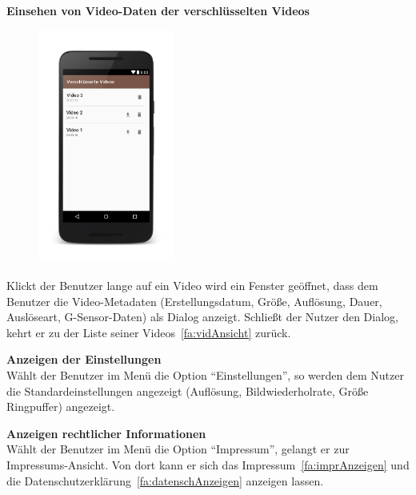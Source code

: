 \begin{enumerate}
\item \label{fa:metaVerschlVid}
\textbf{Einsehen von Video-Daten der verschlüsselten Videos} \hfill \\
\begin{minipage}[t]{\linewidth}
	\begin{figure}
		\vspace{-35pt}
  		\begin{center}
   			\includegraphics[width=0.4\textwidth]{subtopicsFuncspec/Res/Mockups/Videos_list1_phone.png}
  		\end{center}
  		\vspace{-20pt}
  		\vspace{-10pt}
	\end{figure}
Klickt der Benutzer lange auf ein Video wird ein Fenster geöffnet, dass dem Benutzer die Video-\gls{Metadaten} (Erstellungsdatum, Größe, Auflösung, Dauer, Auslöseart, \gls{G-Sensor}-Daten) als Dialog anzeigt. Schließt der Nutzer den Dialog, kehrt er zu der Liste seiner Videos~\eqref{fa:vidAnsicht} zurück.

\item \label{fa:einstAnsicht}\textbf{Anzeigen der Einstellungen} \hfill \\
Wählt der Benutzer im Menü die Option ``Einstellungen'', so werden dem Nutzer die Standardeinstellungen angezeigt (Auflösung, Bildwiederholrate, Größe \gls{Ringpuffer}) angezeigt.

\item \label{fa:imprAnsicht}\textbf{Anzeigen rechtlicher Informationen} \hfill \\
Wählt der Benutzer im Menü die Option ``Impressum'', gelangt er zur Impressums-Ansicht. Von dort kann er sich das Impressum~\eqref{fa:imprAnzeigen} und die Datenschutzerklärung~\eqref{fa:datenschAnzeigen} anzeigen lassen.
\end{minipage}


\end{enumerate}
